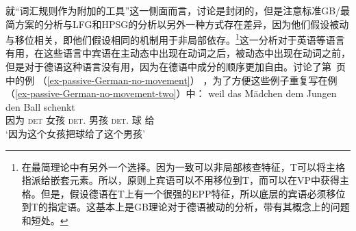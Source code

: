 就“词汇规则作为附加的工具”这一侧面而言，讨论是封闭的，但是注意标准GB/最简方案的分析与LFG和HPSG的分析以另外一种方式存在差异，因为他们假设被动与移位相关，即他们假设相同的机制用于非局部依存。\footnote{
在最简理论中有另外一个选择。因为一致可以非局部核查特征，T可以将主格指派给嵌套元素。所以，原则上宾语可以不用移位到T，而可以在VP中获得主格。但是，\citet[]{Adger2003a}假设德语在T上有一个很强的EPP特征，所以底层的宾语必须移位到T的指定语。这基本上是GB理论对于德语被动的分析，带有其概念上的问题和短处。  
}这一分析对于英语等语言有用，在这些语言中宾语在主动态中出现在动词之后，被动态中出现在动词之前，但是对于德语这种语言没有用，因为在德语中成分的顺序更加自由。\citet[\S~4.4.3]{Lenerz77}讨论了第~\pageref{ex-passive-German-no-movement}页中的例 （\ref{ex-passive-German-no-movement}） ，为了方便这些例子重复写在例（\ref{ex-passive-German-no-movement-two}）中：
\eal
\label{ex-passive-German-no-movement-two}
\ex 
\gll weil das Mädchen dem Jungen den Ball schenkt\\
     因为 \textsc{det} 女孩 \textsc{det}.\dat{} 男孩 \textsc{det}.\acc{} 球 给\\
\glt `因为这个女孩把球给了这个男孩'
